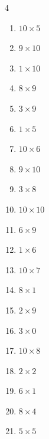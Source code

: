 \begin{multicols}{4}
\begin{enumerate}
  \item $10\times 5$
        \phantom{$=50$}

  \item $9\times 10$
        \phantom{$=90$}

  \item $1\times 10$
        \phantom{$=10$}

  \item $8\times 9$
        \phantom{$=72$}

  \item $3\times 9$
        \phantom{$=27$}

  \item $1\times 5$
        \phantom{$=5$}

  \item $10\times 6$
        \phantom{$=60$}

  \item $9\times 10$
        \phantom{$=90$}

  \item $3\times 8$
        \phantom{$=24$}

  \item $10\times 10$
        \phantom{$=100$}

  \item $6\times 9$
        \phantom{$=54$}

  \item $1\times 6$
        \phantom{$=6$}

  \item $10\times 7$
        \phantom{$=70$}

  \item $8\times 1$
        \phantom{$=8$}

  \item $2\times 9$
        \phantom{$=18$}

  \item $3\times 0$
        \phantom{$=0$}

  \item $10\times 8$
        \phantom{$=80$}

  \item $2\times 2$
        \phantom{$=4$}

  \item $6\times 1$
        \phantom{$=6$}

  \item $8\times 4$
        \phantom{$=32$}

  \item $5\times 5$
        \phantom{$=25$}


\end{enumerate}
\end{multicols}
